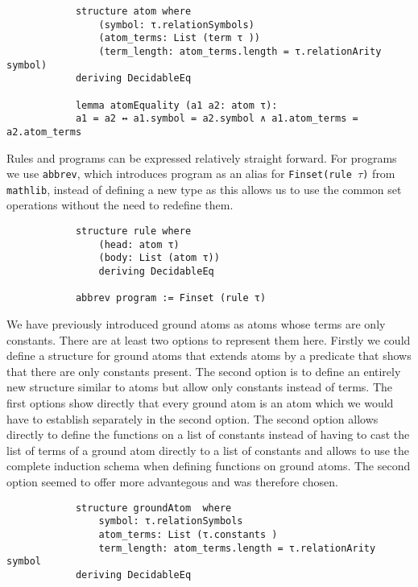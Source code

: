 \documentclass{article}
\begin{document}
        \begin{lstlisting}
            structure atom where
                (symbol: τ.relationSymbols)
                (atom_terms: List (term τ ))
                (term_length: atom_terms.length = τ.relationArity symbol)
            deriving DecidableEq

            lemma atomEquality (a1 a2: atom τ): 
            a1 = a2 ↔ a1.symbol = a2.symbol ∧ a1.atom_terms = a2.atom_terms 

        \end{lstlisting}

        Rules and programs can be expressed relatively straight forward. For programs we use \texttt{abbrev}, which introduces program as an alias for \texttt{Finset(rule $\tau$)} from \texttt{mathlib},  instead of defining a new type as this allows us to use the common set operations without the need to redefine them.

        \begin{lstlisting}
            structure rule where
                (head: atom τ)
                (body: List (atom τ))
                deriving DecidableEq

            abbrev program := Finset (rule τ)
        \end{lstlisting}

        We have previously introduced ground atoms as atoms whose terms are only constants. There are at least two options to represent them here. Firstly we could define a structure for ground atoms that extends atoms by a predicate that shows that there are only constants present. The second option is to define an entirely new structure similar to atoms but allow only constants instead of terms. The first options show directly that every ground atom is an atom which we would have to establish separately in the second option. The second option allows directly to define the functions on a list of constants instead of having to cast the list of terms of a ground atom directly to a list of constants and allows to use the complete induction schema when defining functions on ground atoms. The second option seemed to offer more advantegous and was therefore chosen.

        \begin{lstlisting}
            structure groundAtom  where
                symbol: τ.relationSymbols
                atom_terms: List (τ.constants )
                term_length: atom_terms.length = τ.relationArity symbol
            deriving DecidableEq
        \end{lstlisting}
\end{document}
